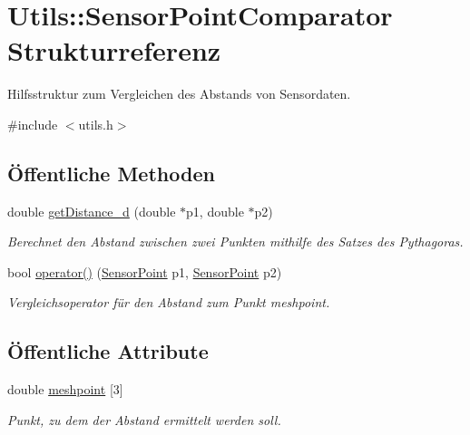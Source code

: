 \hypertarget{structUtils_1_1SensorPointComparator}{\section{Utils\-:\-:Sensor\-Point\-Comparator Strukturreferenz}
\label{structUtils_1_1SensorPointComparator}
}


Hilfsstruktur zum Vergleichen des Abstands von Sensordaten.  




{\ttfamily \#include $<$utils.\-h$>$}

\subsection*{Öffentliche Methoden}
\begin{DoxyCompactItemize}
\item 
double \hyperlink{structUtils_1_1SensorPointComparator_a2b31195024a7ec123551b2bb87043a68}{get\-Distance\-\_\-d} (double $\ast$p1, double $\ast$p2)
\begin{DoxyCompactList}\small\item\em Berechnet den Abstand zwischen zwei Punkten mithilfe des Satzes des Pythagoras. \end{DoxyCompactList}\item 
bool \hyperlink{structUtils_1_1SensorPointComparator_a92795eac49f9ea851c04a623c5a3d6b6}{operator()} (\hyperlink{structUtils_1_1SensorPoint}{Sensor\-Point} p1, \hyperlink{structUtils_1_1SensorPoint}{Sensor\-Point} p2)
\begin{DoxyCompactList}\small\item\em Vergleichsoperator für den Abstand zum Punkt meshpoint. \end{DoxyCompactList}\end{DoxyCompactItemize}
\subsection*{Öffentliche Attribute}
\begin{DoxyCompactItemize}
\item 
double \hyperlink{structUtils_1_1SensorPointComparator_a51335aca914559e34d9202b67d90b143}{meshpoint} \mbox{[}3\mbox{]}
\begin{DoxyCompactList}\small\item\em Punkt, zu dem der Abstand ermittelt werden soll. \end{DoxyCompactList}\end{DoxyCompactItemize}



